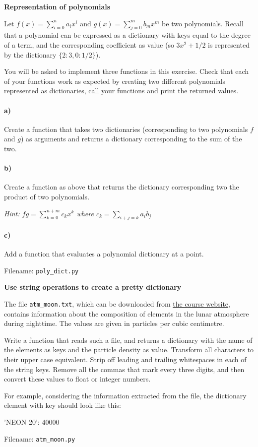 \begin{Problem}{\textbf{Representation of polynomials}} \label{prob62}

\noindent Let $f(x)=\sum_{i=0}^n a_ix^i$ and $g(x)=\sum_{j=0}^mb_mx^m$ be two polynomials.
Recall that a polynomial can be expressed as a dictionary with keys equal to the
degree of a term, and the corresponding coefficient as value (so $3x^2+1/2$ is represented
by the dictionary $\{2: 3, 0: 1/2\}$).

You will be asked to implement three functions in this exercise. Check that each of your functions work as expected by creating two different polynomials represented as dictionaries, call your functions and print the returned values.

\paragraph{a)}
Create a function that takes two dictionaries (corresponding to two polynomials
$f$ and $g$) as arguments and returns a dictionary corresponding to the sum of the two.

\paragraph{b)}
Create a function as above that returns the dictionary corresponding two the
product of two polynomials.

\emph{Hint: $fg=\sum_{k=0}^{n+m} c_kx^k$ where $c_k=\sum_{i+j=k}a_ib_j$}

\paragraph{c)}
Add a function that evaluates a polynomial dictionary at a point.

Filename: \texttt{poly\_dict.py}
\end{Problem}

\begin{Problem} \textbf{Use string operations to create a pretty dictionary}

\noindent
The file \texttt{atm\_moon.txt}, which can be downloaded from \href{\dataurl}{the course website},
contains information about the composition of elements in the lunar atmosphere
during nighttime. The values are given in particles per cubic centimetre.

Write a function that reads such a file, and returns a dictionary with the name of
the elements as keys and the particle density as value. Transform all characters to
their upper case equivalent. Strip off leading and trailing whitespaces in each of
the string keys. Remove all the commas that mark every three digits, and then
convert these values to float or integer numbers.

For example, considering the information  extracted from the file,
the dictionary element with key  should look like this:
\begin{python}
'NEON 20': 40000
\end{python}

Filename: \texttt{atm\_moon.py}
\end{Problem}

